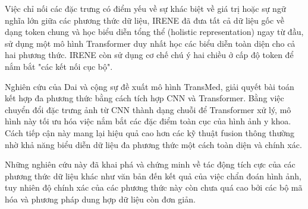 \begin{refsection}
Việc chỉ nối các đặc trưng có điểm yếu về sự khác biệt về giá trị hoặc sự ngữ nghĩa lớn giữa các phương thức dữ liệu, IRENE \cite{IRENE} đã đưa tất cả dữ liệu gốc về dạng token chung và học biểu diễn tổng thể (holistic representation) ngay từ đầu, sử dụng một mô hình Transformer duy nhất học các biểu diễn toàn diện cho cả hai phương thức. IRENE còn sử dụng cơ chế chú ý hai chiều ở cấp độ token để nắm bắt "các kết nối cục bộ".

Nghiên cứu của Dai và cộng sự \cite{TransMed21} đề xuất mô hình TransMed, giải quyết bài toán kết hợp đa phương thức bằng cách tích hợp CNN và Transformer. Bằng việc chuyển đổi đặc trưng ảnh từ CNN thành dạng chuỗi để Transformer xử lý, mô hình này tối ưu hóa việc nắm bắt các đặc điểm toàn cục của hình ảnh y khoa. Cách tiếp cận này mang lại hiệu quả cao hơn các kỹ thuật fusion thông thường nhờ khả năng biểu diễn dữ liệu đa phương thức một cách toàn diện và chính xác.

Những nghiên cứu này đã khai phá và chứng minh về tác động tích cực của các phương thức dữ liệu khác như văn bản đến kết quả của việc chẩn đoán hình ảnh, tuy nhiên độ chính xác của các phương thức này còn chưa quá cao bởi các bộ mã hóa và phương pháp dung hợp dữ liệu còn đơn giản.



\end{refsection}
